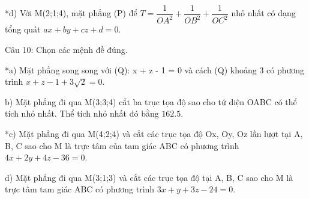 \documentclass[a4paper,12pt]{article}
\begin{document}
*d) Với M(2;1;4), mặt phẳng (P) để \(T=\dfrac{1}{OA^2}+\dfrac{1}{OB^2}+\dfrac{1}{OC^2}\) nhỏ nhất có dạng tổng quát \(ax+by+cz+d=0\).



Câu 10: Chọn các mệnh đề đúng.

*a) Mặt phẳng song song với (Q): x + z - 1 = 0 và cách (Q) khoảng 3 có phương trình \(x + z - 1 + 3\sqrt{2} = 0\).

b) Mặt phẳng đi qua M(3;3;4) cắt ba trục tọa độ sao cho tứ diện OABC có thể tích nhỏ nhất. Thể tích nhỏ nhất đó bằng \(162.5\).

*c) Mặt phẳng đi qua M(4;2;4) và cắt các trục tọa độ Ox, Oy, Oz lần lượt tại A, B, C sao cho M là trực tâm của tam giác ABC có phương trình \(4x + 2y + 4z - 36 = 0\).

d) Mặt phẳng đi qua M(3;1;3) và cắt các trục tọa độ tại A, B, C sao cho M là trực tâm tam giác ABC có phương trình \(3x + y + 3z - 24 = 0\).
\end{document}
